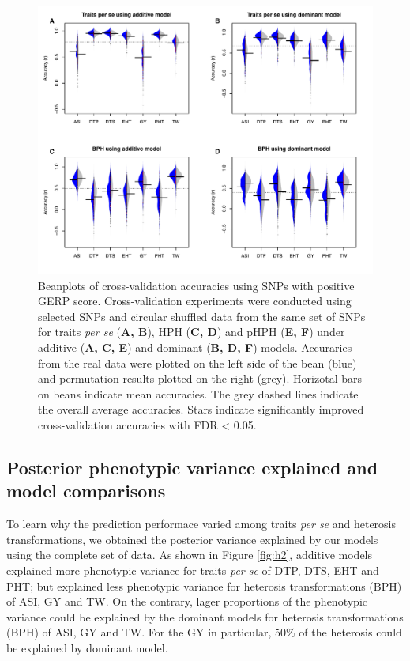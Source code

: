 \documentclass[9pt,twocolumn,twoside]{gsajnl}
\begin{document}
\begin{figure}[htbp]
\centering
\includegraphics[width=\linewidth]{Figure_gerpall.pdf}
\caption{Beanplots of cross-validation accuracies using SNPs with positive GERP score. Cross-validation experiments were conducted using selected SNPs and circular shuffled data from the same set of SNPs for traits \emph{per se} (\textbf{A, B}), HPH (\textbf{C, D}) and pHPH (\textbf{E, F}) under additive (\textbf{A, C, E}) and dominant (\textbf{B, D, F}) models. Accuraries from the real data were plotted on the left side of the bean (blue) and permutation results plotted on the right (grey). Horizotal bars on beans indicate mean accuracies. The grey dashed lines indicate the overall average accuracies. Stars indicate significantly improved cross-validation accuracies with FDR < 0.05.}
\label{fig:gerpall}
\end{figure}


\subsection*{Posterior phenotypic variance explained and model comparisons}

To learn why the prediction performace varied among traits \emph{per se} and heterosis transformations, we obtained the posterior variance explained by our models using the complete set of data. As shown in Figure \ref{fig:h2}, additive models explained more phenotypic variance for traits \emph{per se} of DTP, DTS, EHT and PHT; but explained less phenotypic variance for heterosis transformations (BPH) of ASI, GY and TW. On the contrary, lager proportions of the phenotypic variance could be explained by the dominant models for heterosis transformations (BPH) of ASI, GY and TW. For the GY in particular, 50\% of the heterosis could be explained by dominant model.   
\end{document}
